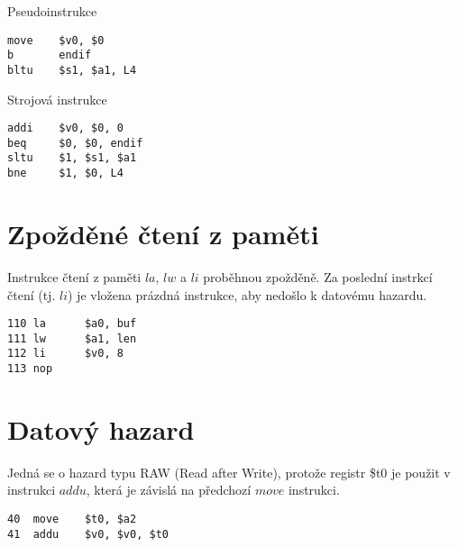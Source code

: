 \documentclass[titlepage]{article}
\begin{document}
\begin{center}
\begin{minipage}[b]{0.45\linewidth}
Pseudoinstrukce
\begin{verbatim}
move	$v0, $0
b		endif
bltu	$s1, $a1, L4

\end{verbatim}
\end{minipage}
\begin{minipage}[b]{0.45\linewidth}
Strojová instrukce
\begin{verbatim}
addi	$v0, $0, 0
beq		$0, $0, endif
sltu	$1, $s1, $a1
bne		$1, $0, L4
\end{verbatim}
\end{minipage}
\end{center}

\section{Zpožděné čtení z paměti}
Instrukce čtení z paměti $la$, $lw$ a $li$ proběhnou zpožděně. Za poslední
instrkcí čtení (tj. $li$) je vložena prázdná instrukce, aby nedošlo k datovému
hazardu.

\begin{verbatim}
110 la		$a0, buf
111 lw		$a1, len
112 li		$v0, 8
113 nop
\end{verbatim}

\section{Datový hazard}
Jedná se o hazard typu RAW (Read after Write), protože registr \$t0 je použit v
instrukci $addu$, která je závislá na předchozí $move$ instrukci.
\begin{verbatim}
40	move	$t0, $a2
41	addu 	$v0, $v0, $t0
\end{verbatim}
\end{document}
